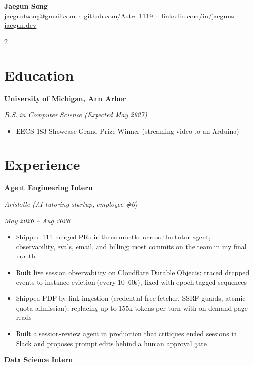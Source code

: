 \documentclass[11pt,letterpaper]{article}
\begin{document}
\begin{center}
{\Large\textbf{Jaegun Song}}\\[2pt]
\small
\href{mailto:jaeguntsong@gmail.com}{jaeguntsong@gmail.com} \,$\cdot$\, 
\href{https://github.com/Astral1119}{github.com/Astral1119} \,$\cdot$\, 
\href{https://linkedin.com/in/jaeguns}{linkedin.com/in/jaeguns} \,$\cdot$\, 
\href{https://jaegun.dev}{jaegun.dev}
\end{center}

\vspace{-6pt}

\begin{multicols}{2}

\section*{Education}
\textbf{University of Michigan, Ann Arbor}

\textit{B.S. in Computer Science (Expected May 2027)}

\begin{itemize}
  \item EECS 183 Showcase Grand Prize Winner (streaming video to an Arduino)
\end{itemize}

\section*{Experience}
\textbf{Agent Engineering Intern}

\textit{Aristotle (AI tutoring startup, employee \#6)}

\textit{May 2026 – Aug 2026}

\begin{itemize}
  \item Shipped 111 merged PRs in three months across the tutor agent, observability, evals, email, and billing; most commits on the team in my final month
  \item Built live session observability on Cloudflare Durable Objects; traced dropped events to instance eviction (every 10–60s), fixed with epoch-tagged sequences
  \item Shipped PDF-by-link ingestion (credential-free fetcher, SSRF guards, atomic quota admission), replacing up to 155k tokens per turn with on-demand page reads
  \item Built a session-review agent in production that critiques ended sessions in Slack and proposes prompt edits behind a human approval gate
\end{itemize}
\textbf{Data Science Intern}


\end{multicols}
\end{document}
